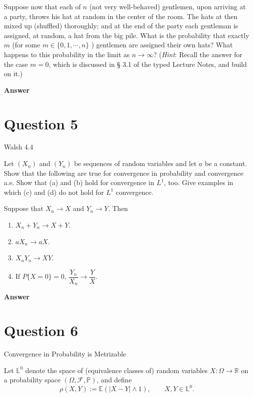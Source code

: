 \documentclass[letterpaper]{article}
\begin{document}
		Suppose now that each of $n$ (not very well-behaved) gentlemen, upon arriving at a party, throws his hat at random in the center of the room. The hats at then mixed up (shuffled) thoroughly; and at the end of the party each gentleman is assigned, at random, a hat from the big pile. What is the probability that exactly $m$ (for some $m \in\{0,1, \cdots, n\}$ ) gentlemen are assigned their own hats? What happens to this probability in the limit as $n \rightarrow \infty$? (\emph{Hint}: Recall the answer for the case $m=0$, which is discussed in § 3.1 of the typed Lecture Notes, and build on it.)
		
		
		\textbf{Answer}
		
		\clearpage
		
		\section{Question 5}
		
		{\color{deepred} Walsh 4.4} 
		
		Let $(X_n)$ and $(Y_n)$ be sequences of random variables and let $a$ be a constant. Show that the following are true for convergence in probability and convergence a.e. Show that (a) and (b) hold for convergence in $L^1$, too. Give examples in which (c) and (d) do not hold for $L^1$ convergence.
		
		Suppose that $X_n \to X$ and $Y_n \to Y$. Then
		\begin{enumerate}
			\item[(a)] $X_n + Y_n \to X + Y$.
			\item[(b)] $aX_n \to aX$.
			\item[(c)] $X_n Y_n \to XY$.
			\item[(d)] If $P\{X = 0\} = 0$, $\dfrac{Y_n}{X_n} \to \dfrac{Y}{X}$.
		\end{enumerate}
		
		\textbf{Answer}
		
		\clearpage
		
		\section{Question 6}
		
		{\color{deepred} Convergence in Probability is Metrizable}
		
		
		Let $\mathbb{L}^{0}$ denote the space of (equivalence classes of) random variables
		$X:\Omega\to\mathbb{R}$ on a probability space $(\Omega,\mathcal{F},\mathbb{P})$,
		and define
		\[
		\rho(X,Y):=\mathbb{E}(|X-Y|\wedge 1), \qquad X,Y\in\mathbb{L}^{0}.
		\]
		
\end{document}
